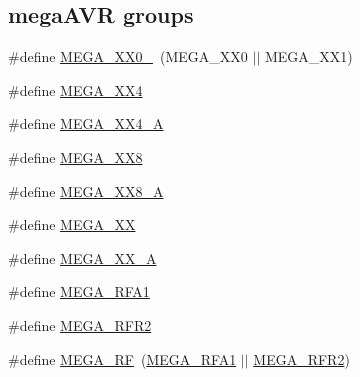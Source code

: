 \subsection*{mega\-A\-V\-R groups}
\begin{DoxyCompactItemize}
\item 
\#define \hyperlink{group__mega__part__macros__group_ga59ba73abcf65d3d398e7d37d78c271fe}{M\-E\-G\-A\-\_\-\-X\-X0\-\_}~(M\-E\-G\-A\-\_\-\-X\-X0 $|$$|$ M\-E\-G\-A\-\_\-\-X\-X1)
\item 
\#define \hyperlink{group__mega__part__macros__group_gadcf5297df4d3d2f2bb5ccd7d6e3578b6}{M\-E\-G\-A\-\_\-\-X\-X4}
\item 
\#define \hyperlink{group__mega__part__macros__group_gaf7dde20cbd5a8e5d53438e8dfac074a2}{M\-E\-G\-A\-\_\-\-X\-X4\-\_\-\-A}
\item 
\#define \hyperlink{group__mega__part__macros__group_ga47583caa82990781cd23a8495710ef31}{M\-E\-G\-A\-\_\-\-X\-X8}
\item 
\#define \hyperlink{group__mega__part__macros__group_gadb4a50447f658e564b640ca248e85b51}{M\-E\-G\-A\-\_\-\-X\-X8\-\_\-\-A}
\item 
\#define \hyperlink{group__mega__part__macros__group_gabdf992a84b61d19055315a473c2e0f20}{M\-E\-G\-A\-\_\-\-X\-X}
\item 
\#define \hyperlink{group__mega__part__macros__group_ga2b23bf35c1439ec05ddac769a8d8d1f8}{M\-E\-G\-A\-\_\-\-X\-X\-\_\-\-A}
\item 
\#define \hyperlink{group__mega__part__macros__group_gaa301ab9851fc885a2d07f5df47d0a893}{M\-E\-G\-A\-\_\-\-R\-F\-A1}
\item 
\#define \hyperlink{group__mega__part__macros__group_gaa5278eedfdfffaeb7c2c49aff7c2eb97}{M\-E\-G\-A\-\_\-\-R\-F\-R2}
\item 
\#define \hyperlink{group__mega__part__macros__group_ga1d762b037d9532cdfbc28404113aa480}{M\-E\-G\-A\-\_\-\-R\-F}~(\hyperlink{group__mega__part__macros__group_gaa301ab9851fc885a2d07f5df47d0a893}{M\-E\-G\-A\-\_\-\-R\-F\-A1} $|$$|$ \hyperlink{group__mega__part__macros__group_gaa5278eedfdfffaeb7c2c49aff7c2eb97}{M\-E\-G\-A\-\_\-\-R\-F\-R2})
\end{DoxyCompactItemize}
